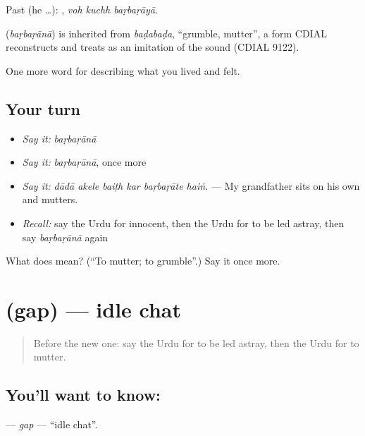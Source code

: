 Past (he …):   , \emph{voh kuchh baṛbaṛāyā}.

\begin{cousinweb}
\textbf{} (\emph{baṛbaṛānā}) is inherited from \emph{baḍabaḍa}, \textquotedblleft{}grumble, mutter\textquotedblright{}, a form CDIAL reconstructs and treats as an imitation of the sound (CDIAL 9122).
\end{cousinweb}

\begin{grammarlens}[title={What you've built}]
One more word for describing what you lived and felt.
\end{grammarlens}

\subsection*{Your turn}
\begin{itemize}
\raggedright
  \item \emph{Say it:} \emph{baṛbaṛānā}
  \item \emph{Say it:} \emph{baṛbaṛānā}, once more
  \item \emph{Say it:} \emph{dādā akele baiṭh kar baṛbaṛāte haiṅ.} — My grandfather sits on his own and mutters.
  \item \emph{Recall:} say the Urdu for innocent, then the Urdu for to be led astray, then say \emph{baṛbaṛānā} again
\end{itemize}

\begin{tcolorbox}[breakable,colback=teal!4,colframe=teal!35!black,title={Before you move on}]
What does  mean? (\textquotedblleft{}To mutter; to grumble\textquotedblright{}.) Say it once more.
\end{tcolorbox}
\section[\texorpdfstring{\ur{گپ} (gap)}{گپ (gap)}]{ (gap) — idle chat}

\label{lesson:UR-C463-gap}



\begin{quote}
Before the new one: say the Urdu for to be led astray, then the Urdu for to mutter.
\end{quote}

\subsection*{You'll want to know: }
\textbf{} — \emph{gap} — \textquotedblleft{}idle chat\textquotedblright{}.

